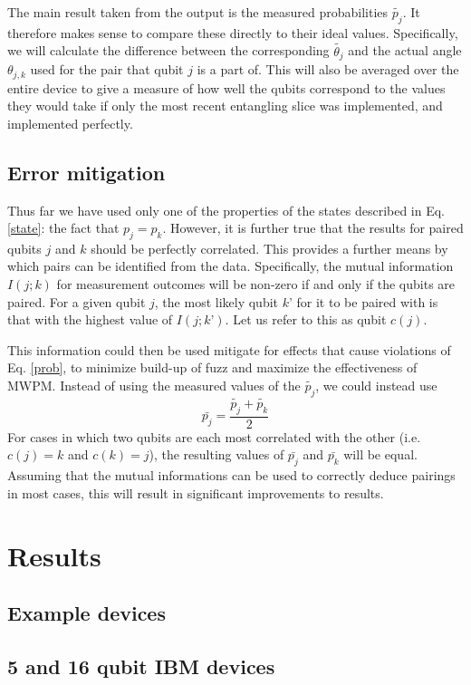 \documentclass[aps,prl,twocolumn,showpacs,preprintnumbers]{revtex4-1}
\newcommand{\be}{\begin{equation}}
\newcommand{\ee}{\end{equation}}
\begin{document}
The main result taken from the output is the measured probabilities $\tilde{p_j}$. It therefore makes sense to compare these directly to their ideal values. Specifically, we will calculate the difference between the corresponding $\tilde{\theta_j}$ and the actual angle $\theta_{j,k}$ used for the pair that qubit $j$ is a part of. This will also be averaged over the entire device to give a measure of how well the qubits correspond to the values they would take if only the most recent entangling slice was implemented, and implemented perfectly.

\subsection{Error mitigation}

Thus far we have used only one of the properties of the states described in Eq. \ref{state}: the fact that $p_j=p_k$. However, it is further true that the results for paired qubits $j$ and $k$ should be perfectly correlated. This provides a further means by which pairs can be identified from the data. Specifically, the mutual information $I(j;k)$ for measurement outcomes will be non-zero if and only if the qubits are paired. For a given qubit $j$, the most likely qubit $k’$ for it to be paired with is that with the highest value of $I(j;k’)$. Let us refer to this as qubit $c(j)$.

This information could then be used mitigate for effects that cause violations of Eq. \ref{prob}, to minimize build-up of fuzz and maximize the effectiveness of MWPM. Instead of using the measured values of the $\tilde{p_j}$, we could instead use
\be
\bar{p_j} = \frac{ \tilde{p_j} + \tilde{p_k} }{2}
\ee
For cases in which two qubits are each most correlated with the other (i.e. $c(j)=k$ and $c(k)=j$), the resulting values of $\bar{p_j}$ and $\bar{p_k}$ will be equal. Assuming that the mutual informations can be used to correctly deduce pairings in most cases, this will result in significant improvements to results.


\section{Results}

\subsection{Example devices}

\subsection{5 and 16 qubit IBM devices}
\end{document}
